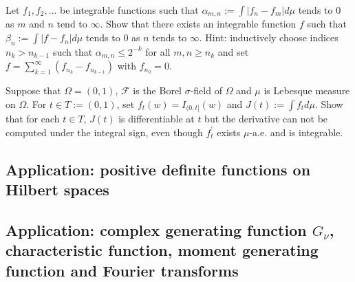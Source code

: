 \begin{exercise}[{\bf $L^1$ is complete}]
Let $f_1, f_2, \ldots$ be integrable functions such that $\alpha_{m,n}:=\int |f_n-f_m|d\mu$ tends to $0$ as $m$ and $n$ tend to $\infty$. Show that there exists an integrable function $f$ such that $\beta_n:=\int |f-f_n|d\mu$ tends to $0$ as $n$ tends to $\infty$. Hint: inductively choose indices $n_k> n_{k-1}$ such that $\alpha_{m,n}\leq 2^{-k}$ for all $m,n\geq n_k$ and set $f=\sum_{k=1}^\infty (f_{n_k}- f_{n_{k-1}})$ with $f_{n_0}=0$.
\end{exercise}

\begin{exercise}
Suppose that $\Omega = (0,1)$, $\mathcal F$ is the Borel $\sigma$-field of $\Omega$ and $\mu$ is Lebesque measure on $\Omega$. For $t\in T:=(0,1)$, set $f_t(w)= I_{(0,t]}(w)$ and $J(t):= \int f_t d\mu$. Show that for each $t\in T$, $J(t)$ is differentiable at $t$ but the derivative can not be computed under the integral sign, even though $f_t^\prime$ exists $\mu$-a.e. and is integrable.
\end{exercise}





\subsection{Application: positive definite functions on Hilbert spaces}




\subsection{Application: complex generating function $G_\nu$, characteristic function, moment generating function and Fourier transforms}






